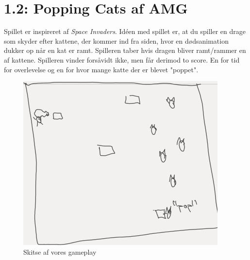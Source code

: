 \documentclass[a4paper]{article}
\begin{document}
\section*{1.2: Popping Cats af AMG}
Spillet er inspireret af \textit{Space Invaders}. Idéen med spillet er, at du spiller en drage som skyder efter kattene, der kommer ind fra siden, hvor en dødsanimation dukker op når en kat er ramt. Spilleren taber hvis dragen bliver ramt/rammer en af kattene. Spilleren vinder forsåvidt ikke, men får derimod to score. En for tid for overlevelse og en for hvor mange katte der er blevet "poppet".
\begin{figure}[h]
	\centering
	\includegraphics[scale=0.8]{kladde_spil.png}
	\caption{Skitse af vores gameplay}
	\label{fig: skitse_spil}
\end{figure}
\end{document}
